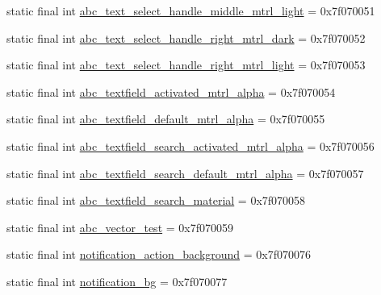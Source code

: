 \begin{DoxyCompactItemize}
\item 
static final int \mbox{\hyperlink{classandroid_1_1support_1_1v7_1_1appcompat_1_1_r_1_1drawable_afcedd039cec83d38f6f17910e1f37893}{abc\+\_\+text\+\_\+select\+\_\+handle\+\_\+middle\+\_\+mtrl\+\_\+light}} = 0x7f070051
\item 
static final int \mbox{\hyperlink{classandroid_1_1support_1_1v7_1_1appcompat_1_1_r_1_1drawable_a2f2b50c4199149da3511997382c7cb46}{abc\+\_\+text\+\_\+select\+\_\+handle\+\_\+right\+\_\+mtrl\+\_\+dark}} = 0x7f070052
\item 
static final int \mbox{\hyperlink{classandroid_1_1support_1_1v7_1_1appcompat_1_1_r_1_1drawable_a9571ee55f1f31cd4cdb2a5abab28b0a6}{abc\+\_\+text\+\_\+select\+\_\+handle\+\_\+right\+\_\+mtrl\+\_\+light}} = 0x7f070053
\item 
static final int \mbox{\hyperlink{classandroid_1_1support_1_1v7_1_1appcompat_1_1_r_1_1drawable_ae8bbef6c2b80b044a07e1d6780e06aff}{abc\+\_\+textfield\+\_\+activated\+\_\+mtrl\+\_\+alpha}} = 0x7f070054
\item 
static final int \mbox{\hyperlink{classandroid_1_1support_1_1v7_1_1appcompat_1_1_r_1_1drawable_a7c33f295eda00f089cb60a480e595b5e}{abc\+\_\+textfield\+\_\+default\+\_\+mtrl\+\_\+alpha}} = 0x7f070055
\item 
static final int \mbox{\hyperlink{classandroid_1_1support_1_1v7_1_1appcompat_1_1_r_1_1drawable_a00703e7605d149c1c96ba37e9a700fe0}{abc\+\_\+textfield\+\_\+search\+\_\+activated\+\_\+mtrl\+\_\+alpha}} = 0x7f070056
\item 
static final int \mbox{\hyperlink{classandroid_1_1support_1_1v7_1_1appcompat_1_1_r_1_1drawable_a7f879ca4144a7a5c7ce00c1365719a05}{abc\+\_\+textfield\+\_\+search\+\_\+default\+\_\+mtrl\+\_\+alpha}} = 0x7f070057
\item 
static final int \mbox{\hyperlink{classandroid_1_1support_1_1v7_1_1appcompat_1_1_r_1_1drawable_ab7f05c2630051bd2d1746ef890c755fa}{abc\+\_\+textfield\+\_\+search\+\_\+material}} = 0x7f070058
\item 
static final int \mbox{\hyperlink{classandroid_1_1support_1_1v7_1_1appcompat_1_1_r_1_1drawable_ac31c3e65556e850c56278ad4e637a344}{abc\+\_\+vector\+\_\+test}} = 0x7f070059
\item 
static final int \mbox{\hyperlink{classandroid_1_1support_1_1v7_1_1appcompat_1_1_r_1_1drawable_ab2de29fab5e00c453c246bb047928c54}{notification\+\_\+action\+\_\+background}} = 0x7f070076
\item 
static final int \mbox{\hyperlink{classandroid_1_1support_1_1v7_1_1appcompat_1_1_r_1_1drawable_aa779a928f01e080c4c632654e16b6d6a}{notification\+\_\+bg}} = 0x7f070077

\end{DoxyCompactItemize}
